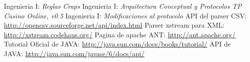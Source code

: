 
\begin{thebibliography}{20}

 Ingenieria I: \emph{Reglas Craps}
 Ingenieria I: \emph{Arquitectura Conceptual y Protocolos TP Casino Online, v0.5}
 Ingenieria I: \emph{Modificaciones al protocolo}
 API del parser CSV: \url{http://opencsv.sourceforge.net/api/index.html}
 Parser xstream para XML: \url{http://xstream.codehaus.org/}
 Pagina de apache ANT: \url{http://ant.apache.org/}
 Tutorial Oficial de JAVA: \url{http://java.sun.com/docs/books/tutorial/}
 API de JAVA: \url{http://java.sun.com/javase/6/docs/api/}

\end{thebibliography}